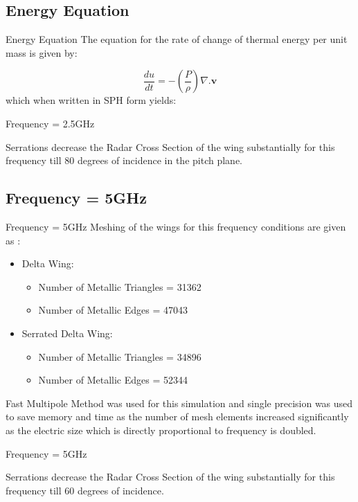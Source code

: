 \documentclass{beamer}
\begin{document}
\subsection{Energy Equation}
\begin{frame}{Energy Equation}
The equation for the rate of change of thermal energy per unit mass is given by:

\begin{equation*}
 \frac{du}{dt} = -\left( \frac{P}{\rho} \right)\nabla. \mathbf{v}
\end{equation*}
which when written in SPH form yields:

\end{frame}

\begin{frame}{Frequency = 2.5GHz}


Serrations decrease the Radar Cross Section of the wing substantially for this frequency till 80 degrees of incidence in the pitch plane.
\end{frame}


\subsection{Frequency = 5GHz}
\begin{frame}{Frequency = 5GHz}
\justifying
Meshing of the wings for this frequency conditions are given as :
\begin{itemize}
\item Delta Wing:
\begin{itemize}
	\item Number of Metallic Triangles = 31362
	\item Number of Metallic Edges = 47043
\end{itemize}
\item Serrated Delta Wing:
\begin{itemize}
\item Number of Metallic Triangles = 34896
\item Number of Metallic Edges = 52344
\end{itemize}
\end{itemize}
Fast Multipole Method was used for this simulation and single precision was used to save memory and time as the number of mesh elements increased significantly as the electric size which is directly proportional to frequency is doubled.
\end{frame}

\begin{frame}{Frequency = 5GHz}

Serrations decrease the Radar Cross Section of the wing substantially for this frequency till 60 degrees of incidence.
\end{frame}
\end{document}
